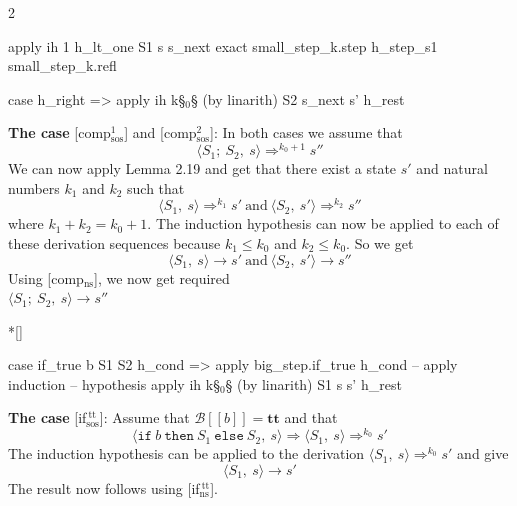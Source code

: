 \begin{paracol}{2}
\begin{leftcolumn}
\begin{Lean_Code}
            apply ih 1 h_lt_one
              S1 s s_next
            exact
              small_step_k.step
              h_step_s1
              small_step_k.refl

          case h_right =>
            apply ih k§\(_0\)§
              (by linarith) S2
              s_next s' h_rest
    \end{Lean_Code}
\end{leftcolumn}
\begin{rightcolumn}
\textbf{The case} [comp$_{\text{sos}}^{\text{1}}$] and [comp$_{\text{sos}}^{\text{2}}$]:
In both cases we assume that
\[
\langle S_1;\ S_2,\ s \rangle \Rightarrow^{k_0 + 1} s''
\]
We can now apply Lemma 2.19 and get that there exist a state \(s'\) and natural numbers
\(k_1\) and \(k_2\) such that
\[
\langle S_1,\ s \rangle \Rightarrow^{k_1} s'\ \mbox{and}\ \langle S_2,\ s' \rangle \Rightarrow^{k_2} s''
\]
where \(k_1 + k_2 = k_0 + 1\). The induction hypothesis can now be applied to each of these
derivation sequences because \(k_1 \leq k_0\) and \(k_2 \leq k_0\). So we get
\[
\langle S_1,\ s \rangle \to s'\ \mbox{and}\ \langle S_2,\ s' \rangle \to s''
\]
Using [comp$_{\text{ns}}$], we now get required \\
\(\langle S_1;\ S_2,\ s \rangle \to s''\)
\end{rightcolumn}
\vspace{2em}


\switchcolumn[1]*[]
\begin{leftcolumn}
    \begin{Lean_Code}
        case if_true
            b S1 S2 h_cond =>
          apply
            big_step.if_true
            h_cond
          -- apply induction
          -- hypothesis
          apply ih k§\(_0\)§
            (by linarith) S1
            s s' h_rest
    \end{Lean_Code}
\end{leftcolumn}
\begin{rightcolumn}
\textbf{The case} [if$_{\text{sos}}^{\ \text{tt}}$]: Assume that
\(\mathcal{B}[\![b]\!] = \mathbf{tt}\) and that
\[
\langle \mathtt{if}\ b\ \mathtt{then}\ S_1\ \mathtt{else}\ S_2,\ s \rangle \Rightarrow \langle S_1,\ s \rangle \Rightarrow^{k_0} s'
\]
The induction hypothesis can be applied to the derivation \(\langle S_1,\ s \rangle \Rightarrow^{k_0} s'\) and
give
\[
\langle S_1,\ s \rangle \to s'
\]
The result now follows using [if$_{\text{ns}}^{\ \text{tt}}$].

\end{rightcolumn}
\vspace{2em}



\end{paracol}
